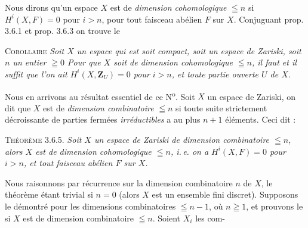 Nous dirons qu'un espace $X$ est de \textit{dimension cohomologique} $\leqq n$
si $H^i(X,F)=0$ pour $i>n$, pour tout faisceau abélien $F$ sur $X$. Conjuguant
prop. 3.6.1 et prop. 3.6.3 on trouve le

\indent\textsc{Corollaire} \textit{Soit $X$ un espace qui est soit
compact, soit un espace de Zariski, soit $n$ un entier $\geqq0$ Pour que $X$
soit de dimension cohomologique $\leqq n$, il faut et il suffit que l'on ait
$H^i(X,\mathbf Z_U)=0$ pour $i>n$, et toute partie ouverte $U$ de $X$.}

Nous en arrivons au résultat essentiel de ce N\textsuperscript{o}. Soit $X$ un
espace de Zariski, on dit que $X$ est de \textit{dimension combinatoire}
$\leqq n$ si toute suite strictement décroissante de parties fermées
\textit{irréductibles} a au plus $n+1$ éléments. Ceci dit :

\indent\textsc{Théorème 3.6.5.} \textit{Soit $X$ un espace de Zariski de
dimension combinatoire $\leqq n$, alors $X$ est de dimension cohomologique
$\leqq n$, i.\,e. on a $H^i(X,F)=0$ pour $i>n$, et tout faisceau abélien $F$
sur $X$.}

Nous raisonnons par récurrence sur la dimension combinatoire $n$ de $X$, le
théorème étant trivial si $n=0$ (alors $X$ est un ensemble fini discret).
Supposons le démontré pour les dimensions combinatoires $\leqq n-1$, où
$n\geqq1$, et prouvons le si $X$ est de dimension combinatoire $\leqq n$.
Soient $X_i$ les com-

